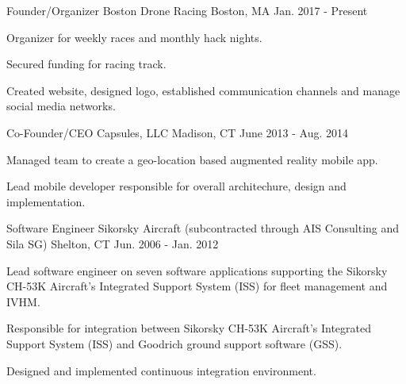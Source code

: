 

\begin{cventries}

  \cventry
    {Founder/Organizer} %
    {Boston Drone Racing} %
    {Boston, MA} %
    {Jan. 2017 - Present} %
    {
      \begin{cvitems} %
      \item {Organizer for weekly races and monthly hack nights.}
      \item {Secured funding for racing track. }
      \item {Created website, designed logo, established communication channels
              and manage social
              media networks. }
      \end{cvitems}
    }

  \cventry
    {Co-Founder/CEO} %
    {Capsules, LLC} %
    {Madison, CT} %
    {June 2013 - Aug. 2014} %
    {
      \begin{cvitems} %
      \item {Managed team to create a geo-location based augmented reality
              mobile app.}
      \item {Lead mobile developer responsible for overall architechure, design and implementation.}
      \end{cvitems}
    }

  \cventry
    {Software Engineer} %
    {Sikorsky Aircraft {\scriptsize\textnormal{(subcontracted through AIS Consulting
                and Sila SG)}}} %
    {Shelton, CT} %
    {Jun. 2006 - Jan. 2012} %
    {
      \begin{cvitems} %
      \item {Lead software engineer on seven software applications supporting the
              Sikorsky CH-53K Aircraft's Integrated Support System (ISS) for
              fleet management and IVHM. }
        \item {Responsible for integration between Sikorsky CH-53K Aircraft's
                Integrated Support System (ISS) and Goodrich ground support
                software (GSS).}
        \item {Designed and implemented continuous integration environment.}
      \end{cvitems}
    }


\end{cventries}
